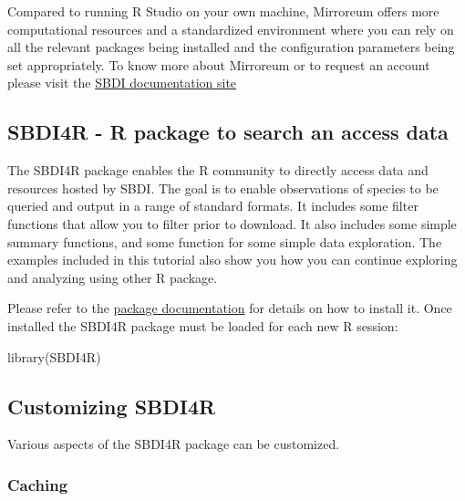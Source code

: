 \documentclass[
  10pt,
]{article}
\newenvironment{Shaded}{\begin{snugshade}}{\end{snugshade}}
\newcommand{\FunctionTok}[1]{\textcolor[rgb]{0.00,0.00,0.00}{#1}}
\newcommand{\NormalTok}[1]{#1}
\begin{document}
Compared to running R Studio on your own machine, Mirroreum offers more
computational resources and a standardized environment where you can rely on all
the relevant packages being installed and the configuration parameters being set
appropriately.
To know more about Mirroreum or to request an account please visit the \href{https://docs.biodiversitydata.se/analyse-data/mirroreum/}{SBDI documentation site}

\hypertarget{sbdi4r---r-package-to-search-an-access-data}{%
\subsection*{SBDI4R - R package to search an access data}\label{sbdi4r---r-package-to-search-an-access-data}}

The SBDI4R package enables the R community to directly access data and resources
hosted by SBDI. The goal is to enable observations of species to be
queried and output in a range of standard formats. It includes some filter functions
that allow you to filter prior to download. It also includes some simple summary
functions, and some function for some simple data exploration. The examples
included in this tutorial also show you how you can continue exploring and analyzing
using other R package.

Please refer to the \href{https://biodiversitydata-se.github.io/SBDI4R}{package documentation}
for details on how to install it. Once installed the SBDI4R package must be loaded
for each new R session:

\begin{Shaded}
\begin{Highlighting}[]
\FunctionTok{library}\NormalTok{(SBDI4R)}
\end{Highlighting}
\end{Shaded}

\hypertarget{customizing-sbdi4r}{%
\subsection*{Customizing SBDI4R}\label{customizing-sbdi4r}}

Various aspects of the SBDI4R package can be customized.

\hypertarget{caching}{%
\subsubsection*{Caching}\label{caching}}
\end{document}
